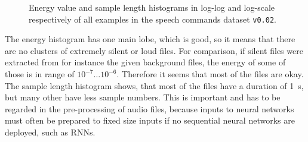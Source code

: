 \begin{figure}[!ht]
  \centering
  \caption{Energy value and sample length histograms in log-log and log-scale respectively of all examples in the speech commands dataset \texttt{v0.02}.}
  \label{fig:exp_dataset_hist}
\end{figure}
\FloatBarrier
\noindent
The energy histogram has one main lobe, which is good, so it means that there are no clusters of extremely silent or loud files.
For comparison, if silent files were extracted from for instance the given background files, the energy of some of those is in range of $10^{-7} \dots 10^{-6}$. Therefore it seems that most of the files are okay.
The sample length histogram shows, that most of the files have a duration of \SI{1}{\second}, but many other have less sample numbers. 
This is important and has to be regarded in the pre-processing of audio files, because inputs to neural networks must often be prepared to fixed size inputs if no sequential neural networks are deployed, such as RNNs.



